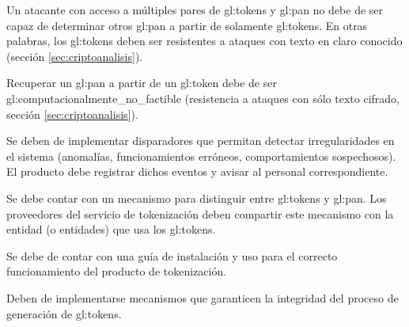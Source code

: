 {
  Un atacante con acceso a múltiples pares de \glspl{gl:token} y
  \gls{gl:pan} no debe de ser capaz de determinar otros \gls{gl:pan} a partir
  de solamente \glspl{gl:token}. En otras palabras, los \glspl{gl:token}
  deben ser resistentes a ataques con texto en claro conocido (sección
  \ref{sec:criptoanalisis}).
}

{
  Recuperar un \gls{gl:pan} a partir de un \gls{gl:token} debe de ser
  \gls{gl:computacionalmente_no_factible} (resistencia a ataques con sólo
  texto cifrado, sección \ref{sec:criptoanalisis}).
}

{
  Se deben de implementar disparadores que permitan detectar
  irregularidades en el sistema (anomalías, funcionamientos erróneos,
  comportamientos sospechosos). El producto debe registrar dichos eventos y
  avisar al personal correspondiente.
}

{
  Se debe contar con un mecanismo para distinguir entre \glspl{gl:token}
  y \gls{gl:pan}. Los proveedores del servicio de tokenización deben
  compartir este mecanismo con la entidad (o entidades) que usa los
  \glspl{gl:token}.
}

{
  Se debe de contar con una guía de instalación y uso para el correcto
  funcionamiento del producto de tokenización.
}

{
  Deben de implementarse mecanismos que garanticen la integridad del proceso
  de generación de \glspl{gl:token}.
}

